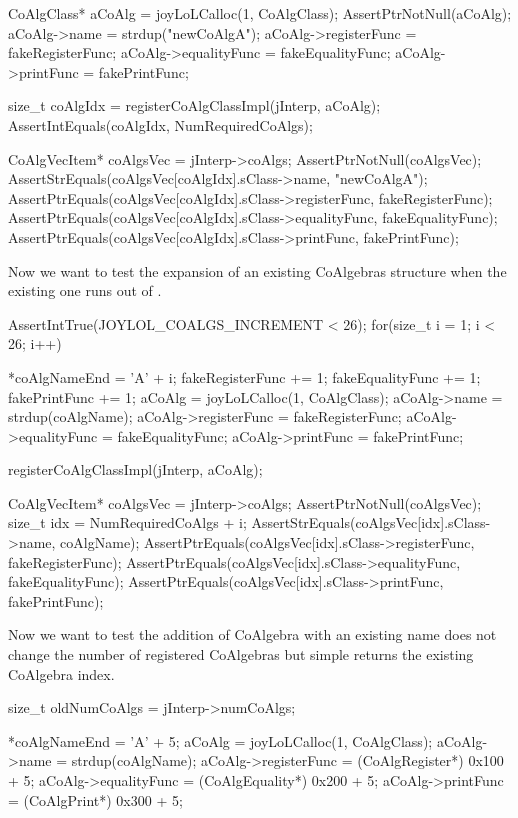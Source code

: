   CoAlgClass* aCoAlg   = joyLoLCalloc(1, CoAlgClass);
  AssertPtrNotNull(aCoAlg);
  aCoAlg->name         = strdup("newCoAlgA");
  aCoAlg->registerFunc = fakeRegisterFunc;
  aCoAlg->equalityFunc = fakeEqualityFunc;
  aCoAlg->printFunc    = fakePrintFunc;

  size_t coAlgIdx = registerCoAlgClassImpl(jInterp, aCoAlg);
  AssertIntEquals(coAlgIdx, NumRequiredCoAlgs);

  CoAlgVecItem* coAlgsVec = jInterp->coAlgs;
  AssertPtrNotNull(coAlgsVec);
  AssertStrEquals(coAlgsVec[coAlgIdx].sClass->name, "newCoAlgA");
  AssertPtrEquals(coAlgsVec[coAlgIdx].sClass->registerFunc, fakeRegisterFunc);
  AssertPtrEquals(coAlgsVec[coAlgIdx].sClass->equalityFunc, fakeEqualityFunc);
  AssertPtrEquals(coAlgsVec[coAlgIdx].sClass->printFunc,    fakePrintFunc);
\stopCTest

Now we want to test the expansion of an existing CoAlgebras structure when 
the existing one runs out of . 

\startCTest
  AssertIntTrue(JOYLOL_COALGS_INCREMENT < 26);
  for(size_t i = 1; i < 26; i++) {
    *coAlgNameEnd        = 'A' + i;
    fakeRegisterFunc    += 1;
    fakeEqualityFunc    += 1;
    fakePrintFunc       += 1;
    aCoAlg               = joyLoLCalloc(1, CoAlgClass);
    aCoAlg->name         = strdup(coAlgName);
    aCoAlg->registerFunc = fakeRegisterFunc;
    aCoAlg->equalityFunc = fakeEqualityFunc;
    aCoAlg->printFunc    = fakePrintFunc;

    registerCoAlgClassImpl(jInterp, aCoAlg);

    CoAlgVecItem* coAlgsVec = jInterp->coAlgs;
    AssertPtrNotNull(coAlgsVec);
    size_t idx = NumRequiredCoAlgs + i;
    AssertStrEquals(coAlgsVec[idx].sClass->name, coAlgName);
    AssertPtrEquals(coAlgsVec[idx].sClass->registerFunc, fakeRegisterFunc);
    AssertPtrEquals(coAlgsVec[idx].sClass->equalityFunc, fakeEqualityFunc);
    AssertPtrEquals(coAlgsVec[idx].sClass->printFunc,    fakePrintFunc);
  }
\stopCTest

Now we want to test the addition of CoAlgebra with an existing name does 
not change the number of registered CoAlgebras but simple returns the 
existing CoAlgebra index. 

\startCTest
  size_t oldNumCoAlgs  = jInterp->numCoAlgs;

  *coAlgNameEnd        = 'A' + 5;
  aCoAlg               = joyLoLCalloc(1, CoAlgClass);
  aCoAlg->name         = strdup(coAlgName);
  aCoAlg->registerFunc = (CoAlgRegister*)  0x100 + 5;
  aCoAlg->equalityFunc = (CoAlgEquality*)  0x200 + 5;
  aCoAlg->printFunc    = (CoAlgPrint*)     0x300 + 5;
  
